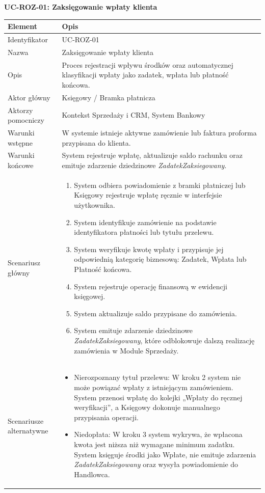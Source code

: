 \textbf{UC-ROZ-01: Zaksięgowanie wpłaty klienta}

\begin{longtable}{|p{4cm}|p{11cm}|}
\hline
\textbf{Element} & \textbf{Opis} \\
\hline

Identyfikator & UC-ROZ-01 \\
\hline

Nazwa & Zaksięgowanie wpłaty klienta \\
\hline

Opis &
Proces rejestracji wpływu środków oraz automatycznej klasyfikacji wpłaty jako zadatek, wpłata lub płatność końcowa. \\
\hline

Aktor główny & Księgowy / Bramka płatnicza \\
\hline

Aktorzy pomocniczy & Kontekst Sprzedaży i CRM, System Bankowy \\
\hline

Warunki wstępne &
W systemie istnieje aktywne zamówienie lub faktura proforma przypisana do klienta. \\
\hline

Warunki końcowe &
System rejestruje wpłatę, aktualizuje saldo rachunku oraz emituje zdarzenie dziedzinowe \textit{ZadatekZaksiegowany}. \\
\hline

Scenariusz główny &
\begin{enumerate}
\item System odbiera powiadomienie z bramki płatniczej lub Księgowy rejestruje wpłatę ręcznie w interfejsie użytkownika.
\item System identyfikuje zamówienie na podstawie identyfikatora płatności lub tytułu przelewu.
\item System weryfikuje kwotę wpłaty i przypisuje jej odpowiednią kategorię biznesową: Zadatek, Wpłata lub Płatność końcowa.
\item System rejestruje operację finansową w ewidencji księgowej.
\item System aktualizuje saldo przypisane do zamówienia.
\item System emituje zdarzenie dziedzinowe \textit{ZadatekZaksiegowany}, które odblokowuje dalszą realizację zamówienia w Module Sprzedaży.
\end{enumerate}
\\
\hline

Scenariusze alternatywne &
\begin{itemize}
\item [A1] Nierozpoznany tytuł przelewu: W kroku 2 system nie może powiązać wpłaty z istniejącym zamówieniem. System przenosi wpłatę do kolejki „Wpłaty do ręcznej weryfikacji”, a Księgowy dokonuje manualnego przypisania operacji.
\item [A2] Niedopłata: W kroku 3 system wykrywa, że wpłacona kwota jest niższa niż wymagane minimum zadatku. System księguje środki jako Wpłate, nie emituje zdarzenia \textit{ZadatekZaksiegowany} oraz wysyła powiadomienie do Handlowca.
\end{itemize}
\\
\hline

\end{longtable}